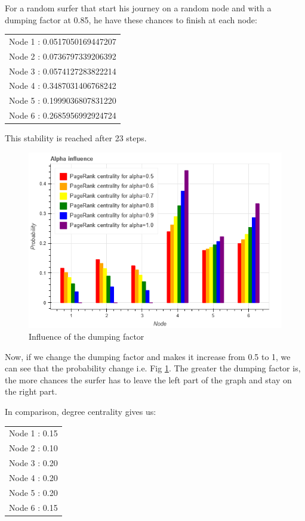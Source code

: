 \documentclass[12pt]{article}
\begin{document}
For a random surfer that start his journey on a random node and with a dumping factor at 0.85, he have these chances to finish at each node:

\begin{center}
\begin{tabular}{c}
Node 1 : 0.0517050169447207\\
Node 2 : 0.0736797339206392\\
Node 3 : 0.0574127283822214\\
Node 4 : 0.3487031406768242\\
Node 5 : 0.1999036807831220\\
Node 6 : 0.2685956992924724  
\end{tabular}
\end{center}

This stability is reached after 23 steps.\\

\begin{figure}
    \centering
    \includegraphics[width=\textwidth]{images/alpha.png}
    \caption{Influence of the dumping factor}
    \label{fig:alpha}
\end{figure}

Now, if we change the dumping factor and makes it increase from 0.5 to 1, we can see that the probability change i.e. Fig \ref{fig:alpha}. The greater the dumping factor is, the more chances the surfer has to leave the left part of the graph and stay on the right part.\

In comparison, degree centrality gives us:

\begin{center}
\begin{tabular}{c}
    Node 1 : 0.15\\
    Node 2 : 0.10\\
    Node 3 : 0.20\\
    Node 4 : 0.20\\
    Node 5 : 0.20\\
    Node 6 : 0.15
\end{tabular}
\end{center}
\end{document}
